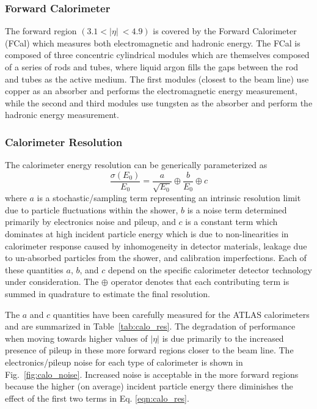 \subsubsection{Forward Calorimeter}
The forward region $(3.1 < |\eta|\ < 4.9)$ is covered by the Forward Calorimeter (FCal) which measures both electromagnetic and hadronic energy.
The FCal is composed of three concentric cylindrical modules which are themselves composed of a series of rods and tubes, where liquid argon fills the gaps between the rod and tubes as the active medium.
The first modules (closest to the beam line) use copper as an absorber and performs the electromagnetic energy measurement, while the second and third modules use tungsten as the absorber and perform the hadronic energy measurement.

\subsubsection{Calorimeter Resolution}
The calorimeter energy resolution can be generically parameterized as
\begin{equation}
    \frac{\sigma(E_0)}{E_0} = \frac{a}{\sqrt{E_0}} \oplus \frac{b}{E_0} \oplus c
    \label{eqn:calo_res}
\end{equation}
where $a$ is a stochastic/sampling term representing an intrinsic resolution limit due to particle fluctuations within the shower, $b$ is a noise term determined primarily by electronics noise and pileup, and $c$ is a constant term which dominates at high incident particle energy which is due to non-linearities in calorimeter response caused by inhomogeneity in detector materials, leakage due to un-absorbed particles from the shower, and calibration imperfections.
Each of these quantities $a$, $b$, and $c$ depend on the specific calorimeter detector technology under consideration.
The $\oplus$ operator denotes that each contributing term is summed in quadrature to estimate the final resolution.

The $a$ and $c$ quantities have been carefully measured for the ATLAS calorimeters \cite{Aharrouche_2006, Strizenec:2009zz, Cojocaru:2004jk, Adragna:2009zz} and are summarized in Table~\ref{tab:calo_res}.
The degradation of performance when moving towards higher values of $|\eta|$ is due primarily to the increased presence of pileup in these more forward regions closer to the beam line.
The electronics/pileup noise for each type of calorimeter is shown in Fig.~\ref{fig:calo_noise}.
Increased noise is acceptable in the more forward regions because the higher (on average) incident particle energy there diminishes the effect of the first two terms in Eq. \ref{eqn:calo_res}.

